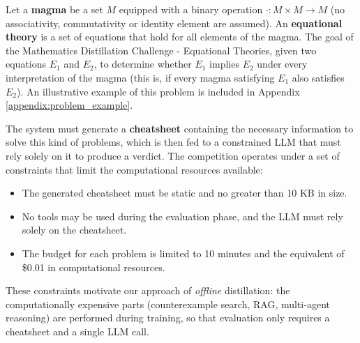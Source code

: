 \documentclass{article}
\begin{document}


Let a \textbf{magma} be a set $M$ equipped with a binary operation $\cdot : M \times M \to M$ (no associativity, commutativity or identity element are assumed). An \textbf{equational theory} is a set of equations that hold for all elements of the magma. The goal of the Mathematics Distillation Challenge - Equational Theories, given two equations $E_1$ and $E_2$, to determine whether $E_1$ implies $E_2$ under every interpretation of the magma (this is, if every magma satisfying $E_1$ also satisfies $E_2$). An illustrative example of this problem is included in Appendix \ref{appendix:problem_example}.

The system must generate a \textbf{cheatsheet} containing the necessary information to solve this kind of problems, which is then fed to a constrained LLM that must rely solely on it to produce a verdict. The competition operates under a set of constraints that limit the computational resources available:
\begin{itemize}
  \item The generated cheatsheet must be static and no greater than 10 KB in size.
  \item No tools may be used during the evaluation phase, and the LLM must rely solely on the cheatsheet.
  \item The budget for each problem is limited to 10 minutes and the equivalent of \$0.01 in computational resources.
\end{itemize}
These constraints motivate our approach of \textit{offline} distillation: the computationally expensive parts (counterexample search, RAG, multi-agent reasoning) are performed during training, so that evaluation only requires a cheatsheet and a single LLM call.
\end{document}
